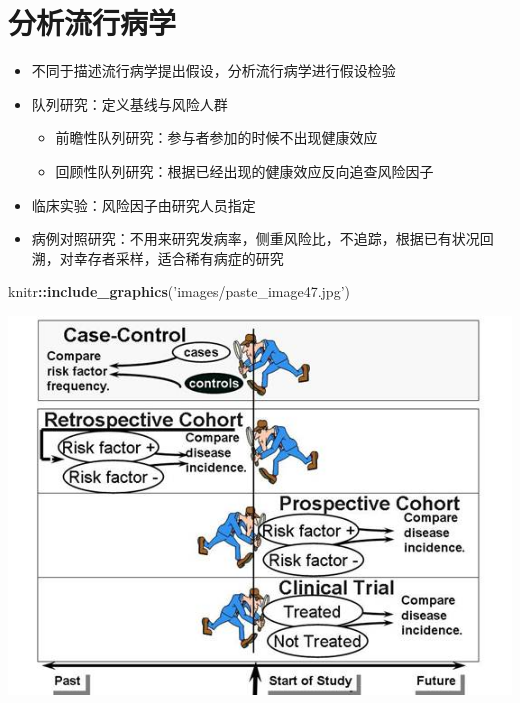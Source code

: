 \documentclass[]{book}
\newenvironment{Shaded}{\begin{snugshade}}{\end{snugshade}}
\newcommand{\KeywordTok}[1]{\textcolor[rgb]{0.13,0.29,0.53}{\textbf{#1}}}
\newcommand{\NormalTok}[1]{#1}
\newcommand{\OperatorTok}[1]{\textcolor[rgb]{0.81,0.36,0.00}{\textbf{#1}}}
\newcommand{\StringTok}[1]{\textcolor[rgb]{0.31,0.60,0.02}{#1}}
\providecommand{\tightlist}{%
  \setlength{\itemsep}{0pt}\setlength{\parskip}{0pt}}
\begin{document}
\section{分析流行病学}

\begin{itemize}
\tightlist
\item
  不同于描述流行病学提出假设，分析流行病学进行假设检验
\item
  队列研究：定义基线与风险人群

  \begin{itemize}
  \tightlist
  \item
    前瞻性队列研究：参与者参加的时候不出现健康效应
  \item
    回顾性队列研究：根据已经出现的健康效应反向追查风险因子
  \end{itemize}
\item
  临床实验：风险因子由研究人员指定
\item
  病例对照研究：不用来研究发病率，侧重风险比，不追踪，根据已有状况回溯，对幸存者采样，适合稀有病症的研究
\end{itemize}

\begin{Shaded}
\begin{Highlighting}[]
\NormalTok{knitr}\OperatorTok{::}\KeywordTok{include_graphics}\NormalTok{(}\StringTok{'images/paste_image47.jpg'}\NormalTok{)}
\end{Highlighting}
\end{Shaded}

\includegraphics{images/paste_image47.jpg}
\end{document}
